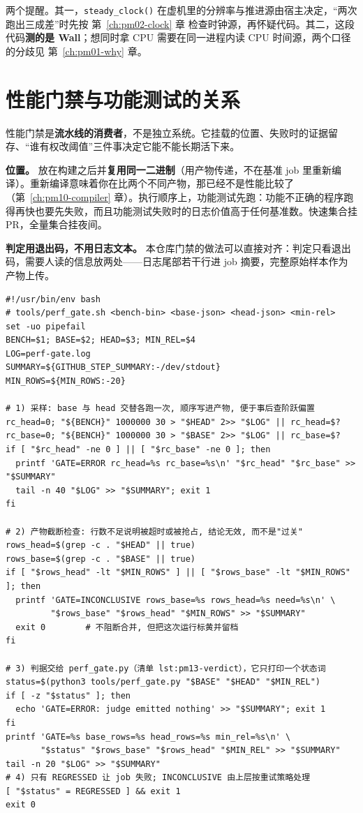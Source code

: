 \documentclass[12pt,a4paper,fontset=fandol]{ctexbook}
\newcommand{\Fn}[1]{\texttt{#1()}}
\newcommand{\Bk}{\discretionary{}{}{}}
\newcommand{\Lang}[1]{\textsf{#1}}
\newcommand{\MWall}{\Lang{Wall}}
\newcommand{\MCpu}{\Lang{CPU}}
\begin{document}
两个提醒。其一，\Fn{steady{\Bk}\_clock} 在虚机里的分辨率与推进源由宿主决定，``两次跑出三成差''时先按 第~\ref{ch:pm02-clock} 章 检查时钟源，再怀疑代码。其二，这段代码\textbf{测的是 \MWall}；想同时拿 \MCpu{} 需要在同一进程内读 CPU 时间源，两个口径的分歧见 第~\ref{ch:pm01-why} 章。

\section{性能门禁与功能测试的关系}
\label{sec:pm13-gate}

性能门禁是\textbf{流水线的消费者}，不是独立系统。它挂载的位置、失败时的证据留存、``谁有权改阈值''三件事决定它能不能长期活下来。

\textbf{位置。} 放在构建之后并\textbf{复用同一二进制}（用产物传递，不在基准 job 里重新编译）。重新编译意味着你在比两个不同产物，那已经不是性能比较了（第~\ref{ch:pm10-compiler} 章）。执行顺序上，功能测试先跑：功能不正确的程序跑得再快也要先失败，而且功能测试失败时的日志价值高于任何基准数。快速集合挂 PR，全量集合挂夜间。

\textbf{判定用退出码，不用日志文本。} 本仓库门禁的做法可以直接对齐：判定只看退出码，需要人读的信息放两处——日志尾部若干行进 job 摘要，完整原始样本作为产物上传。

\begin{lstlisting}[style=shellstyle, caption={门禁封装：退出码单独判失败、日志尾部取证、
产物截断检查（样本行数不足即 INCONCLUSIVE，绝不判回归）}, label={lst:pm13-gate}]
#!/usr/bin/env bash
# tools/perf_gate.sh <bench-bin> <base-json> <head-json> <min-rel>
set -uo pipefail
BENCH=$1; BASE=$2; HEAD=$3; MIN_REL=$4
LOG=perf-gate.log
SUMMARY=${GITHUB_STEP_SUMMARY:-/dev/stdout}
MIN_ROWS=${MIN_ROWS:-20}

# 1) 采样: base 与 head 交替各跑一次, 顺序写进产物, 便于事后查阶跃偏置
rc_head=0; "${BENCH}" 1000000 30 > "$HEAD" 2>> "$LOG" || rc_head=$?
rc_base=0; "${BENCH}" 1000000 30 > "$BASE" 2>> "$LOG" || rc_base=$?
if [ "$rc_head" -ne 0 ] || [ "$rc_base" -ne 0 ]; then
  printf 'GATE=ERROR rc_head=%s rc_base=%s\n' "$rc_head" "$rc_base" >> "$SUMMARY"
  tail -n 40 "$LOG" >> "$SUMMARY"; exit 1
fi

# 2) 产物截断检查: 行数不足说明被超时或被抢占, 结论无效, 而不是"过关"
rows_head=$(grep -c . "$HEAD" || true)
rows_base=$(grep -c . "$BASE" || true)
if [ "$rows_head" -lt "$MIN_ROWS" ] || [ "$rows_base" -lt "$MIN_ROWS" ]; then
  printf 'GATE=INCONCLUSIVE rows_base=%s rows_head=%s need=%s\n' \
         "$rows_base" "$rows_head" "$MIN_ROWS" >> "$SUMMARY"
  exit 0        # 不阻断合并, 但把这次运行标黄并留档
fi

# 3) 判据交给 perf_gate.py（清单 lst:pm13-verdict），它只打印一个状态词
status=$(python3 tools/perf_gate.py "$BASE" "$HEAD" "$MIN_REL")
if [ -z "$status" ]; then
  echo 'GATE=ERROR: judge emitted nothing' >> "$SUMMARY"; exit 1
fi
printf 'GATE=%s base_rows=%s head_rows=%s min_rel=%s\n' \
       "$status" "$rows_base" "$rows_head" "$MIN_REL" >> "$SUMMARY"
tail -n 20 "$LOG" >> "$SUMMARY"
# 4) 只有 REGRESSED 让 job 失败; INCONCLUSIVE 由上层按重试策略处理
[ "$status" = REGRESSED ] && exit 1
exit 0
\end{lstlisting}
\end{document}
